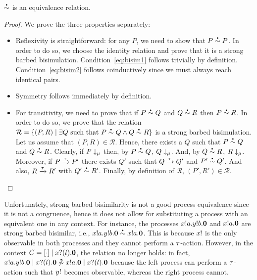 \begin{theorem}
  \( \sbbisim{}{} \) is an equivalence relation. %
\end{theorem}
\begin{proof}
  We prove the three properties separately: 
  \begin{itemize}
  \item Reflexivity is straightforward: for any $P$, we need to show
    that $P\sbbisim{}{} P$. In order to do so, we choose the identity
    relation and prove that it is a strong barbed
    bisimulation. Condition~\ref{eq:bisim1} follows trivially by
    definition. Condition~\ref{eq:bisim2} follows coinductively since
    we must always reach identical pairs.
  \item Symmetry follows immediately by definition.
  \item For transitivity, we need to prove that if $P\sbbisim{}{} Q$
    and $Q\sbbisim{}{} R$ then $P\sbbisim{}{} R$. In order to do so,
    we prove that the relation
    $\mathcal R=\{(P,R)\mid \exists Q\text{ such that }P\sbbisim{}{} Q
    \land Q\sbbisim{}{} R\}$ is a strong barbed bisimulation. Let us
    assume that $(P,R)\in\mathcal R$. Hence, there exists a $Q$ such
    that $P\sbbisim{}{} Q$ and $Q\sbbisim{}{} R$. Clearly, if
    $P\downarrow_{\mu}$ then, by $P\sbbisim{}{} Q$,
    $Q\downarrow_{\mu}$. And, by $Q\sbbisim{}{} R$,
    $R\downarrow_{\mu}$. Moreover, if $P \xrightarrow{\tau} P'$
    there exists $Q'$ such that $Q \xrightarrow{\tau} Q'$ and
    $P'\sbbisim{}{}Q'$. And also, $R \xrightarrow{\tau} R'$ with
    $Q'\sbbisim{}{}R'$. Finally, by definition of $\mathcal R$,
    $(P',R')\in\mathcal R$.
  \end{itemize}
  
\end{proof}

Unfortunately, strong barbed bisimilarity is not a good process
equivalence since it is not a congruence, hence it does not allow for
substituting a process with an equivalent one in any context.
For instance, the processes $x ! a . y ! b . \bm{0}$ and
$x ! a . \bm{0}$ are strong barbed bisimilar, i.e.,
$\sbbisim{\Pout{x}{a}{\Pout{y}{b}{\Pend}}}{\Pout{x}{a}{\Pend}}$. This
is because \( x! \) is the only observable in both processes
and they cannot perform a \( \tau \)-action. However, in the context
$C = [\cdot] \mid x ? (l) . \bm{0}$, the relation no
longer holds: in fact,
$\nsbbisim{\Ppar{\Pout{x}{a}{\Pout{y}{b}{\Pend}}}{\Pin{x}{l}{\Pend}}}{\Pout{x}{a}{\Pend}\Ppar{}{\Pin{x}{l}{\Pend}}}$
%
because the left process can perform a \( \tau \)-action such that
\( y! \) becomes observable, whereas the right process cannot.

